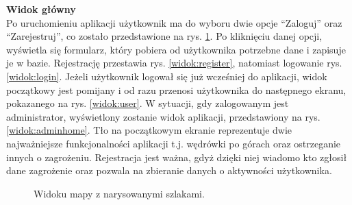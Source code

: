 \noindent
\textbf{Widok główny}\\
\indent Po uruchomieniu aplikacji użytkownik ma do wyboru dwie opcje “Zaloguj” oraz “Zarejestruj”, co zostało przedstawione na rys. \ref{widok:home}. Po kliknięciu danej opcji, wyświetla się formularz, który pobiera od użytkownika potrzebne dane i zapisuje je w bazie. Rejestrację przestawia rys. \ref{widok:register}, natomiast logowanie rys. \ref{widok:login}. Jeżeli użytkownik logował się już wcześniej do aplikacji, widok początkowy jest pomijany i od razu przenosi użytkownika do następnego ekranu, pokazanego na rys. \ref{widok:user}. W sytuacji, gdy zalogowanym jest administrator, wyświetlony zostanie widok aplikacji, przedstawiony na rys. \ref{widok:adminhome}. Tło na początkowym ekranie reprezentuje dwie najważniejsze funkcjonalności aplikacji t.j. wędrówki po górach oraz ostrzeganie innych o zagrożeniu. Rejestracja jest ważna, gdyż dzięki niej wiadomo kto zgłosił dane zagrożenie oraz pozwala na zbieranie danych o aktywności użytkownika.\\

\noindent
\begin{figure}[H]
    \centering
    \caption{Widoku mapy z narysowanymi szlakami.}
    \label{widok:home}
\end{figure}

